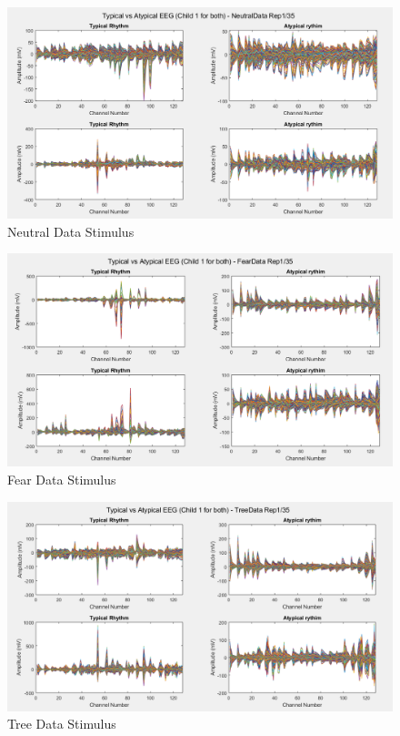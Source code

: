 \begin{appendices}
\begin{figure}[ht!]%
    \centering
    \includegraphics[width=14cm]{images/matplot2}%
    \caption{Neutral Data Stimulus}%
\end{figure}

\vspace{\floatsep}

\begin{figure}[ht!]%
    \centering
    \includegraphics[width=14cm]{images/matplot3}%
    \caption{Fear Data Stimulus}%
\end{figure}

\begin{figure}[ht!]%
    \centering
    \includegraphics[width=14cm]{images/matplot4}%
    \caption{Tree Data Stimulus}%
\end{figure}


\end{appendices}
